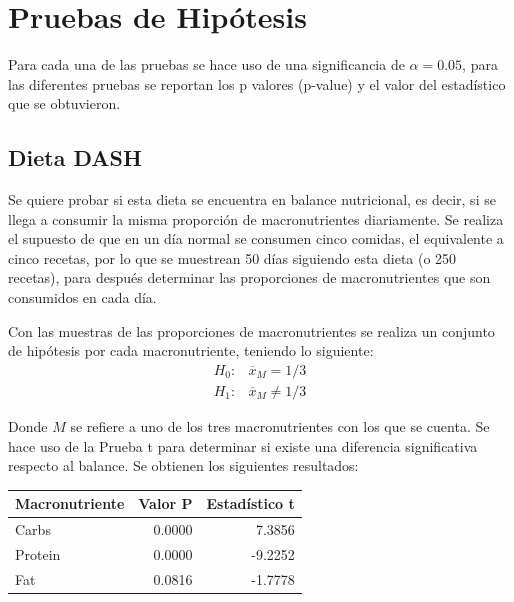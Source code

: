 \documentclass[12pt,a4paper]{article}
\begin{document}
    \section{Pruebas de Hipótesis}
    {
        Para cada una de las pruebas se hace uso de una significancia de $\alpha = 0.05$, 
        para las diferentes pruebas se reportan los p valores (p-value) y el valor del 
        estadístico que se obtuvieron.
    
        \subsection{Dieta DASH}
        {
            Se quiere probar si esta dieta se encuentra 
            en balance nutricional, es decir, si se llega a consumir la 
            misma proporción de macronutrientes diariamente. 
            Se realiza el supuesto de que en un día normal se consumen 
            cinco comidas, el equivalente a cinco recetas, por lo que 
            se muestrean 50 días siguiendo esta dieta (o 250 recetas), 
            para después determinar las proporciones 
            de macronutrientes que son consumidos en cada día.\newline

            Con las muestras de las proporciones de macronutrientes se realiza 
            un conjunto de hipótesis por cada macronutriente, teniendo lo 
            siguiente:
            \begin{align*}
                H_0 :& \overline{x}_M = 1/3  \\
                H_1 :& \overline{x}_M \ne 1/3 
            \end{align*}
        
            Donde $M$ se refiere a uno de los tres macronutrientes con los que 
            se cuenta. Se hace uso de la Prueba t para determinar si existe 
            una diferencia significativa respecto al balance. Se obtienen 
            los siguientes resultados:

            \begin{center}
                \begin{tabular}{lrr}
                \toprule
                    Macronutriente & Valor P & Estadístico t \\
                \midrule
                    Carbs   & 0.0000 &  7.3856 \\
                    Protein & 0.0000 & -9.2252 \\
                    Fat     & 0.0816 & -1.7778 \\
                \bottomrule
                \end{tabular}
            \end{center}

}}
\end{document}
